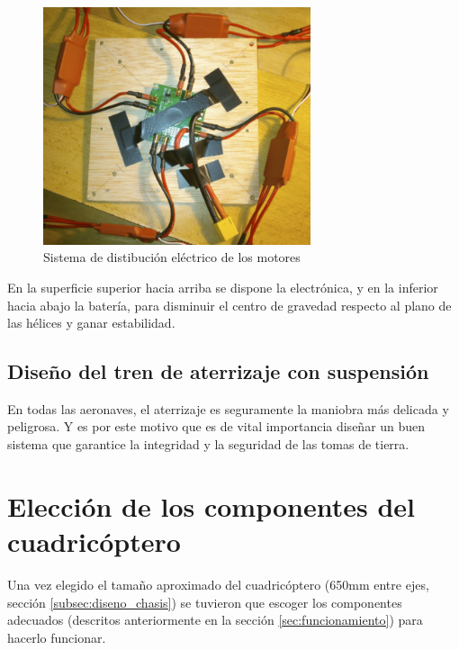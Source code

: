 \documentclass[12pt,twoside]{article}
\begin{document}
		\begin{figure}
			\centering
			\includegraphics[width=0.7\textwidth]{Imatges/Disseny_Chasis/conexiones_esc.png}
			\caption{Sistema de distibución eléctrico de los motores}
			\label{fig:conexiones_esc}
		\end{figure}

En la superficie superior hacia arriba se dispone la electrónica, y en la inferior hacia abajo la batería, para disminuir el centro de gravedad respecto al plano de las hélices y ganar estabilidad.


		\subsection{Diseño del tren de aterrizaje con suspensión}\label{subsec:diseno_suspension}
En todas las aeronaves, el aterrizaje es seguramente la maniobra más delicada y peligrosa. Y es por este motivo que es de vital importancia diseñar un buen sistema que garantice la integridad y la seguridad de las tomas de tierra. 

\newpage
\maketitle

	\section{Elección de los componentes del cuadricóptero}\label{sec:componentes}
	
	Una vez elegido el tamaño aproximado del cuadricóptero (650mm entre ejes, sección \ref{subsec:diseno_chasis}) se tuvieron que escoger los componentes adecuados (descritos anteriormente en la sección \ref{sec:funcionamiento}) para hacerlo funcionar. 
	
\end{document}
